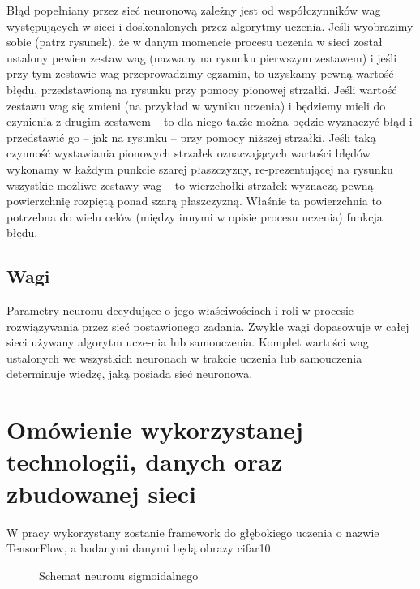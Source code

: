 \documentclass{article}
\begin{document}
Błąd popełniany przez sieć neuronową zależny jest od współczynników wag występujących
w sieci i doskonalonych przez algorytmy uczenia. Jeśli wyobrazimy sobie (patrz rysunek),
że w danym momencie procesu uczenia w sieci został ustalony pewien zestaw wag
(nazwany na rysunku pierwszym zestawem) i jeśli przy tym zestawie wag przeprowadzimy
egzamin, to uzyskamy pewną wartość błędu, przedstawioną na rysunku przy pomocy pionowej
strzałki. Jeśli wartość zestawu wag się zmieni (na przykład w wyniku uczenia)
i będziemy mieli do czynienia z drugim zestawem – to dla niego także można będzie
wyznaczyć błąd i przedstawić go – jak na rysunku – przy pomocy niższej strzałki.
Jeśli taką czynność wystawiania pionowych strzałek oznaczających wartości błędów
wykonamy w każdym punkcie szarej płaszczyzny, re-prezentującej na rysunku wszystkie
możliwe zestawy wag – to wierzchołki strzałek wyznaczą pewną powierzchnię rozpiętą ponad
szarą płaszczyzną. Właśnie ta powierzchnia to potrzebna do wielu celów (między innymi
w opisie procesu uczenia) funkcja błędu.

\subsection{Wagi}

Parametry neuronu decydujące o jego właściwościach i roli w procesie
rozwiązywania przez sieć postawionego zadania. Zwykle wagi dopasowuje
w całej sieci używany algorytm ucze-nia lub samouczenia.
Komplet wartości wag ustalonych we wszystkich neuronach w trakcie uczenia
lub samouczenia determinuje wiedzę, jaką posiada sieć neuronowa.

\section{Omówienie wykorzystanej technologii, danych oraz zbudowanej sieci}

W pracy wykorzystany zostanie framework do głębokiego uczenia o nazwie TensorFlow,
a badanymi danymi będą obrazy cifar10.

\begin{figure}[h]
  \centering
  \caption{Schemat neuronu sigmoidalnego}
\end{figure}
\end{document}
